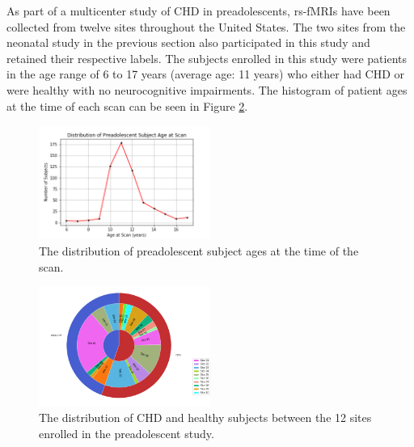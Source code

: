 As part of a multicenter study of CHD in preadolescents, rs-fMRIs have been collected from twelve sites throughout the United States. The two sites from the neonatal study in the previous section also participated in this study and retained their respective labels. The subjects enrolled in this study were patients in the age range of 6 to 17 years (average age: 11 years) who either had CHD or were healthy with no neurocognitive impairments. The histogram of patient ages at the time of each scan can be seen in Figure \ref{fig:pread_ages}.

\begin{figure}
\centering
\includegraphics[width=0.5\textwidth]{5/demo_pread_scan_age.png}
\caption{The distribution of preadolescent subject ages at the time of the scan.}
\label{fig:pread_sites}
\end{figure}

\begin{figure}
\centering
\includegraphics[width=0.5\textwidth]{5/demo_pread_subj_cohort.png}
\caption{The distribution of CHD and healthy subjects between the 12 sites enrolled in the preadolescent study.}
\label{fig:pread_ages}
\end{figure}

